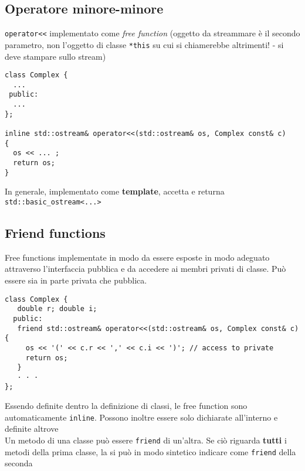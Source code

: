 \documentclass[10pt, oneside]{Book}
\begin{document}
\subsection{Operatore minore-minore}
\texttt{operator<<} implementato come \textit{free function} (oggetto da streammare è il secondo parametro, non l'oggetto di classe \texttt{*this} su cui si chiamerebbe altrimenti! - si deve stampare sullo stream)
\begin{verbatim}
class Complex {
  ...
 public:
  ...
};

inline std::ostream& operator<<(std::ostream& os, Complex const& c)
{
  os << ... ;
  return os;
}
\end{verbatim}
In generale, implementato come \textbf{template}, accetta e returna \texttt{std::basic\_ostream<...>}

\subsection{Friend functions}
Free functions implementate in modo da essere esposte in modo adeguato attraverso l'interfaccia pubblica e da accedere ai membri privati di classe. Può essere sia in parte privata che pubblica.
\begin{verbatim}
class Complex {
   double r; double i;
  public:
   friend std::ostream& operator<<(std::ostream& os, Complex const& c) {
     os << '(' << c.r << ',' << c.i << ')'; // access to private
     return os;
   }
   · · ·
};
\end{verbatim}
Essendo definite dentro la definizione di classi, le free function sono automaticamente \texttt{inline}. Possono inoltre essere solo dichiarate all'interno e definite altrove
\\Un metodo di una classe può essere \texttt{friend} di un'altra. Se ciò riguarda \textbf{tutti} i metodi della prima classe, la si può in modo sintetico indicare come \texttt{friend} della seconda
\end{document}
